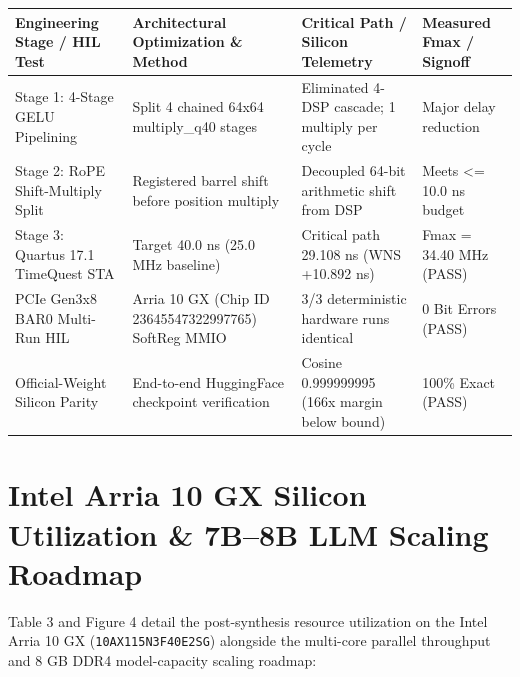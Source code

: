 \documentclass[11pt,a4paper]{article}
\begin{document}
{\footnotesize\renewcommand{\arraystretch}{1.14}\begin{longtable}{@{}L{0.23\textwidth}L{0.27\textwidth}L{0.24\textwidth}L{0.16\textwidth}@{}}\toprule

\textbf{Engineering Stage /\allowbreak{} HIL Test} & \textbf{Architectural Optimization \& Method} & \textbf{Critical Path /\allowbreak{} Silicon Telemetry} & \textbf{Measured Fmax /\allowbreak{} Signoff}\\\midrule\endhead

Stage 1: 4-Stage GELU Pipelining & Split 4 chained 64x64 multiply\_\allowbreak{}q40 stages & Eliminated 4-DSP cascade; 1 multiply per cycle & Major delay reduction\\[2pt]

Stage 2: RoPE Shift-Multiply Split & Registered barrel shift before position multiply & Decoupled 64-bit arithmetic shift from DSP & Meets <=\allowbreak{} 10.0 ns budget\\[2pt]

Stage 3: Quartus 17.1 TimeQuest STA & Target 40.0 ns (\allowbreak{}25.0 MHz baseline)\allowbreak{} & Critical path 29.108 ns (\allowbreak{}WNS +\allowbreak{}10.892 ns)\allowbreak{} & Fmax =\allowbreak{} 34.40 MHz (\allowbreak{}PASS)\allowbreak{}\\[2pt]

PCIe Gen3x8 BAR0 Multi-Run HIL & Arria 10 GX (\allowbreak{}Chip ID 23645547\allowbreak{}32299776\allowbreak{}5)\allowbreak{} SoftReg MMIO & 3/\allowbreak{}3 deterministic hardware runs identical & 0 Bit Errors (\allowbreak{}PASS)\allowbreak{}\\[2pt]

Official-Weight Silicon Parity & End-to-end HuggingFace checkpoint verification & Cosine 0.99999999\allowbreak{}5 (\allowbreak{}166x margin below bound)\allowbreak{} & 100\% Exact (\allowbreak{}PASS)\allowbreak{}\\[2pt]

\bottomrule\end{longtable}}

\section{Intel Arria 10 GX Silicon Utilization \& 7B--8B LLM Scaling Roadmap}

Table 3 and Figure 4 detail the post-synthesis resource utilization on the Intel Arria 10 GX (\texttt{10AX115N3F40E2SG}) alongside the multi-core parallel throughput and 8 GB DDR4 model-capacity scaling roadmap:
\end{document}
